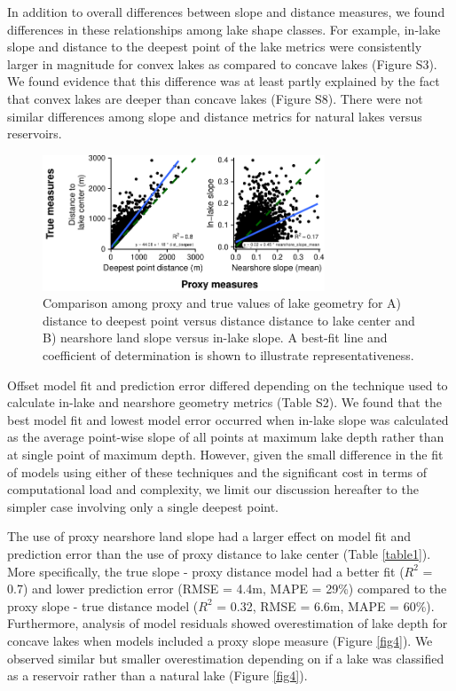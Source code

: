 \documentclass[draft]{agujournal2019}
\begin{document}
In addition to overall differences between slope and distance measures, we found differences in these relationships among lake shape classes. For example, in-lake slope and distance to the deepest point of the lake metrics were consistently larger in magnitude for convex lakes as compared to concave lakes (Figure S3). We found evidence that this difference was at least partly explained by the fact that convex lakes are deeper than concave lakes (Figure S8). There were not similar differences among slope and distance metrics for natural lakes versus reservoirs.

\begin{figure}
  \begin{center}
    \includegraphics[width=0.75\textwidth,keepaspectratio]{../figures/01_geometry_base-1}
  \end{center}
  \caption{Comparison among proxy and true values of lake geometry for A) distance to deepest point versus distance distance to lake center and B) nearshore land slope versus in-lake slope. A best-fit line and coefficient of determination is shown to illustrate representativeness.}\label{fig3}
\end{figure}

Offset model fit and prediction error differed depending on the technique used to calculate in-lake and nearshore geometry metrics (Table S2). We found that the best model fit and lowest model error occurred when in-lake slope was calculated as the average point-wise slope of all points at maximum lake depth rather than at single point of maximum depth. However, given the small difference in the fit of models using either of these techniques and the significant cost in terms of computational load and complexity, we limit our discussion hereafter to the simpler case involving only a single deepest point.

The use of proxy nearshore land slope had a larger effect on model fit and prediction error than the use of proxy distance to lake center (Table \ref{table1}). More specifically, the true slope - proxy distance model had a better fit ($R^2$ = 0.7) and lower prediction error (RMSE = 4.4m, MAPE = 29\%) compared to the proxy slope - true distance model ($R^2$ = 0.32, RMSE = 6.6m, MAPE = 60\%). Furthermore, analysis of model residuals showed overestimation of lake depth for concave lakes when models included a proxy slope measure (Figure \ref{fig4}). We observed similar but smaller overestimation depending on if a lake was classified as a reservoir rather than a natural lake (Figure \ref{fig4}).
\end{document}
